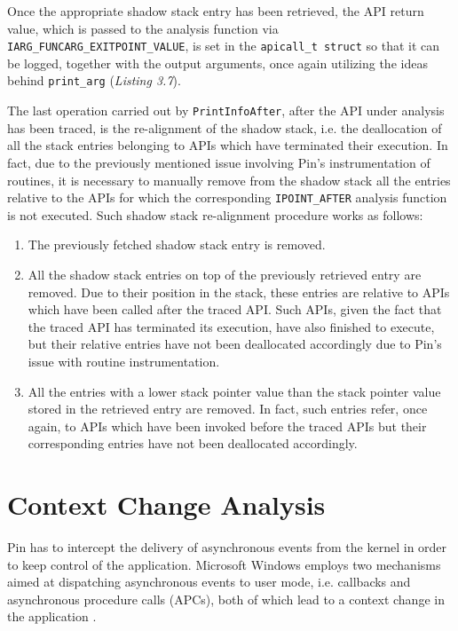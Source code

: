 Once the appropriate shadow stack entry has been retrieved, the API return value, which is passed to the analysis function via \texttt{IARG\_FUNCARG\_EXITPOINT\_VALUE}, is set in the \texttt{apicall\_t struct} so that it can be logged, together with the output arguments, once again utilizing the ideas behind \texttt{print\_arg} (\textit{Listing 3.7}). 

The last operation carried out by \texttt{PrintInfoAfter}, after the API under analysis has been traced, is the re-alignment of the shadow stack, i.e. the deallocation of all the stack entries belonging to APIs which have terminated their execution. In fact, due to the previously mentioned issue involving Pin's instrumentation of routines, it is necessary to manually remove from the shadow stack all the entries relative to the APIs for which the corresponding \texttt{IPOINT\_AFTER} analysis function is not executed. Such shadow stack re-alignment procedure works as follows:

\begin{enumerate}
\item The previously fetched shadow stack entry is removed.
\item All the shadow stack entries on top of the previously retrieved entry are removed. Due to their position in the stack, these entries are relative to APIs which have been called after the traced API. Such APIs, given the fact that the traced API has terminated its execution, have also finished to execute, but their relative entries have not been deallocated accordingly due to Pin's issue with routine instrumentation.
\item All the entries with a lower stack pointer value than the stack pointer value stored in the retrieved entry are removed. In fact, such entries refer, once again, to APIs which have been invoked before the traced APIs but their corresponding entries have not been deallocated accordingly.   
\end{enumerate}

\section{Context Change Analysis} 

Pin has to intercept the delivery of asynchronous events from the kernel in order to keep control of the application.  
Microsoft Windows employs two mechanisms aimed at dispatching asynchronous events to user mode, i.e. callbacks and asynchronous procedure calls (APCs), both of which lead to a context change in the application \cite{5452079}.
 
